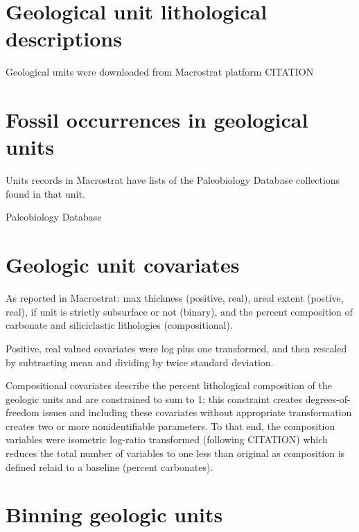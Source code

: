\documentclass[12pt,letterpaper]{article}
\begin{document}
\section{Geological unit lithological descriptions}
Geological units were downloaded from Macrostrat platform CITATION 


\section{Fossil occurrences in geological units}
Units records in Macrostrat have lists of the Paleobiology Database collections found in that unit. 


Paleobiology Database




\section{Geologic unit covariates}


As reported in Macrostrat: max thickness (positive, real), areal extent (postive, real),
if unit is strictly subsurface or not (binary), and 
the percent composition of carbonate and siliciclastic lithologies (compositional). 

Positive, real valued covariates were log plus one transformed, and then rescaled by subtracting mean and dividing by twice standard deviation. 

Compositional covariates describe the percent lithological composition of the geologic units and are constrained to sum to 1; this constraint creates degrees-of-freedom issues and including these covariates without appropriate transformation creates two or more nonidentifiable parameters. To that end, the composition variables were isometric log-ratio transformed (following CITATION) which reduces the total number of variables to one less than original as composition is defined relaid to a baseline (percent carbonates).





\section{Binning geologic units}
\end{document}
